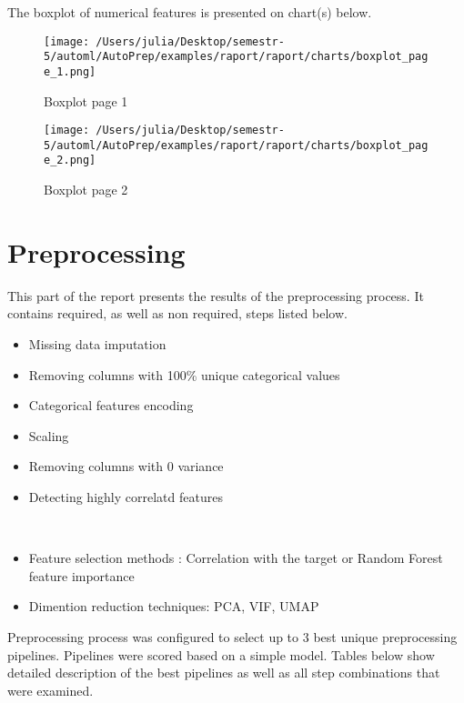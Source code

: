 \documentclass{article}%
\begin{document}
%
The boxplot of numerical features is presented on chart(s) below.%


\begin{figure}[H]%
\centering%
\texttt{[image: /Users/julia/Desktop/semestr-5/automl/AutoPrep/examples/raport/raport/charts/boxplot\_page\_1.png]}%
\caption{Boxplot page 1}%
\label{Boxplot page 1}%
\end{figure}

%


\begin{figure}[H]%
\centering%
\texttt{[image: /Users/julia/Desktop/semestr-5/automl/AutoPrep/examples/raport/raport/charts/boxplot\_page\_2.png]}%
\caption{Boxplot page 2}%
\label{Boxplot page 2}%
\end{figure}

%
\section{Preprocessing}%
\label{sec:Preprocessing}%

%
This part of the report presents the results of the preprocessing process. It contains required, as well as non required, steps listed below. 
%
\\ %
\begin{itemize}%
\item%
Missing data imputation%
\item%
Removing columns with 100\% unique categorical values%
\item%
Categorical features encoding%
\item%
Scaling%
\item%
Removing columns with 0 variance%
\item%
Detecting highly correlatd features%
\end{itemize}%
\\ %
\begin{itemize}%
\item%
Feature selection methods : Correlation with the target or Random Forest feature importance%
\item%
Dimention reduction techniques: PCA, VIF, UMAP%
\end{itemize}%
Preprocessing process was configured to select up to 3 best unique preprocessing pipelines. Pipelines were scored based on a simple model. Tables below show detailed description of the best pipelines as well as all step combinations that were examined. 
%
\end{document}
